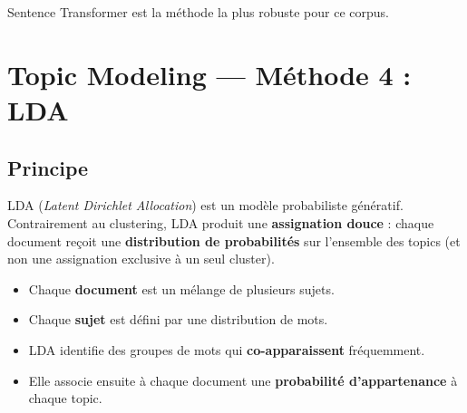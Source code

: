 \documentclass[12pt,a4paper]{article}
\begin{document}
Sentence Transformer est la méthode la plus robuste pour ce corpus.

\pagebreak
\section{Topic Modeling --- Méthode 4 : LDA}

\subsection{Principe}

LDA (\textit{Latent Dirichlet Allocation}) est un modèle probabiliste génératif. Contrairement au clustering, LDA produit une \textbf{assignation douce} : chaque document reçoit une \textbf{distribution de probabilités} sur l'ensemble des topics (et non une assignation exclusive à un seul cluster).

\begin{itemize}
  \item Chaque \textbf{document} est un mélange de plusieurs sujets.
  \item Chaque \textbf{sujet} est défini par une distribution de mots.
  \item LDA identifie des groupes de mots qui \textbf{co-apparaissent} fréquemment.
  \item Elle associe ensuite à chaque document une \textbf{probabilité d'appartenance} à chaque topic.
\end{itemize}

\begin{center}
\end{center}
\end{document}
